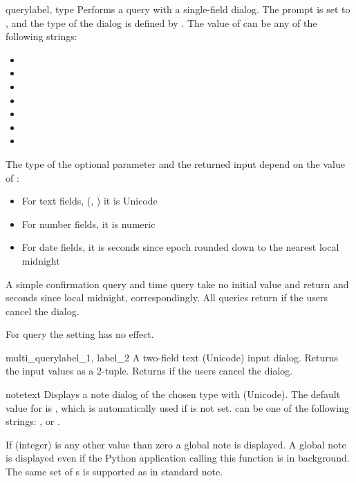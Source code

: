 \begin{funcdesc}{query}{label, type}
Performs a query with a single-field dialog. The prompt is set to 
, and the type of the dialog is defined by . The 
value of  can be any of the following strings:

\begin{itemize}
\item {}
\item {}
\item {}
\item {}
\item {}
\item {}
\item {}
\end{itemize}

The type of the optional  parameter and the 
returned input depend on the value of :

\begin{itemize}
\item For text fields, (, ) it is Unicode
\item For number fields, it is numeric
\item For date fields, it is seconds since epoch rounded down to the nearest local midnight
\end{itemize}

A simple confirmation query and time query take no initial value and return 
 and seconds since local midnight, correspondingly. All 
queries return  if the users cancel the dialog. 

For  query the  setting has no 
effect.
\end{funcdesc}


\begin{funcdesc}{multi_query}{label_1, label_2}
A two-field text (Unicode) input dialog. Returns the input values
as a 2-tuple. Returns  if the users cancel the dialog.
\end{funcdesc}

\begin{funcdesc}{note}{text}
Displays a note dialog of the chosen type with  
(Unicode). The default value for  is , which is 
automatically used if  is not set.  can be one of 
the following strings: ,  or 
. 

If  (integer) is any other value than zero a global note is 
displayed. A global note is displayed even if the Python application calling 
this function is in background. The same set of s is supported as in 
standard note.
\end{funcdesc}

